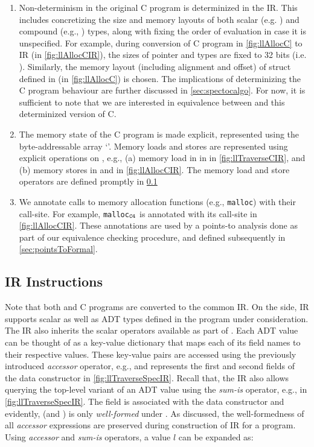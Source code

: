 \begin{enumerate}
\item Non-determinism in the original C program is determinized in the IR.
This includes concretizing the size and memory layouts of both scalar (e.g. )
and compound (e.g., ) types, along with fixing the order of evaluation in case
it is unspecified.
For example, during conversion of C program in \cref{fig:llAllocC} to IR (in \cref{fig:llAllocCIR}),
the sizes of pointer and  types are fixed to 32 bits (i.e. ).
Similarly, the memory layout (including alignment and offset) of  struct defined in  (in \cref{fig:llAllocC}) is chosen.
The implications of determinizing the C program behaviour are further discussed in \cref{sec:spectocalgo}.
For now, it is sufficient to note that we are interested in equivalence between \SpecL{} and this determinized version of C.
\item The memory state of the C program is made explicit, represented using the byte-addressable array `\mem{}'.
Memory loads and stores are represented using explicit operations on \mem{}, e.g.,
(a) memory load in  in  in \cref{fig:llTraverseCIR}, and
(b) memory stores in  and  in \cref{fig:llAllocCIR}.
The memory load and store operators are defined promptly in \cref{sec:irops}
\item We annotate calls to memory allocation functions (e.g., {\tt malloc}) with their call-site.
For example, {\tt malloc$_{{\tt C4}}$} is annotated with its call-site  in \cref{fig:llAllocCIR}.
These annotations are used by a points-to analysis done as part of our equivalence checking procedure,
and defined subsequently in \cref{sec:pointsToFormal}.
\end{enumerate}

\subsection{IR Instructions}
\label{sec:irops}
Note that both \SpecL{} and C programs are converted to the common IR.
On the \SpecL{} side, IR supports scalar as well as ADT types defined in the \SpecL{} program under consideration.
The IR also inherits the scalar operators available as part of \SpecL{}.
Each ADT value can be thought of as a key-value dictionary that maps each of its field names
to their respective values.
These key-value pairs are accessed using the previously introduced {\em accessor} operator,
e.g.,  and  represents the first and second fields of the
 data constructor in \cref{fig:llTraverseSpecIR}.
Recall that, the IR also allows querying the top-level variant of an ADT value using the
{\em sum-is} operator, e.g.,  in \cref{fig:llTraverseSpecIR}.
The  field is associated with the  data constructor and
evidently,  (and ) is only {\em well-formed} under .
As discussed, the well-formedness of all {\em accessor} expressions are preserved during
construction of IR for a \SpecL{} program.
Using {\em accessor} and {\em sum-is} operators, a  value $l$ can be expanded as:

